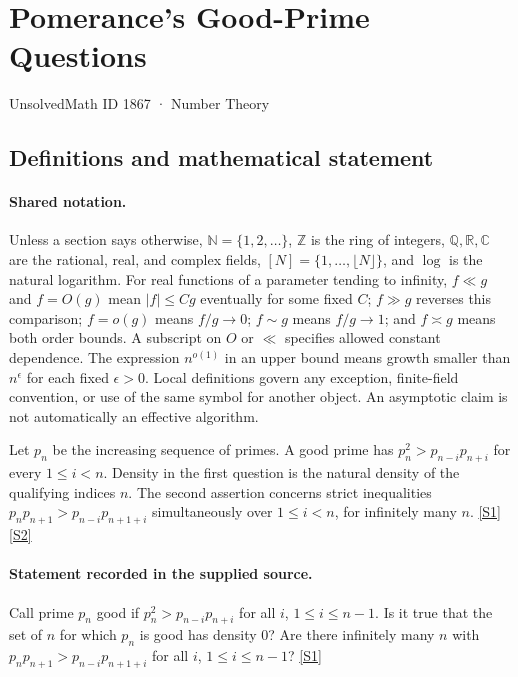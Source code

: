 \documentclass[11pt,a4paper]{article}
\newcommand{\N}{\mathbb{N}}
\newcommand{\Z}{\mathbb{Z}}
\newcommand{\Q}{\mathbb{Q}}
\newcommand{\R}{\mathbb{R}}
\newcommand{\C}{\mathbb{C}}
\newcommand{\sref}[2]{\hyperlink{source:#1:#2}{[S#2]}}
\begin{document}

\setcounter{section}{1866}

\section{Pomerance’s Good-Prime Questions}\label{1867}

{\small\sffamily UnsolvedMath ID 1867 · Number Theory}

\subsection{Definitions and mathematical statement}

\paragraph{Shared notation.}Unless a section says otherwise, $\N=\{1,2,\ldots\}$,
$\Z$ is the ring of integers, $\Q,\R,\C$ are the rational, real, and complex
fields, $[N]=\{1,\ldots,\lfloor N\rfloor\}$, and $\log$ is the natural
logarithm. For real functions of a parameter tending to infinity,
$f\ll g$ and $f=O(g)$ mean $|f|\leq Cg$ eventually for some fixed $C$;
$f\gg g$ reverses this comparison; $f=o(g)$ means $f/g\to0$;
$f\sim g$ means $f/g\to1$; and $f\asymp g$ means both order bounds.
A subscript on $O$ or $\ll$ specifies allowed constant dependence.
The expression $n^{o(1)}$ in an upper bound means growth smaller than
$n^\epsilon$ for each fixed $\epsilon>0$. Local definitions govern any
exception, finite-field convention, or use of the same symbol for another
object. An asymptotic claim is not automatically an effective algorithm.



Let $p_n$ be the increasing sequence of primes. A good prime has $p_n^2>p_{n-i}p_{n+i}$ for every $1\leq i<n$. Density in the first question is the natural density of the qualifying indices $n$. The second assertion concerns strict inequalities $p_np_{n+1}>p_{n-i}p_{n+1+i}$ simultaneously over $1\leq i<n$, for infinitely many $n$. \sref{1867}{1} \sref{1867}{2}

\paragraph{Statement recorded in the supplied source.}
Call prime $p_n$ good if $p_n^2 > p_{n-i}p_{n+i}$ for all $i$, $1 \le i \le n-1$. Is it true that the set of $n$ for which $p_n$ is good has density 0? Are there infinitely many $n$ with $p_n p_{n+1} > p_{n-i} p_{n+1+i}$ for all $i$, $1 \le i \le n-1$? \sref{1867}{1}
\end{document}
